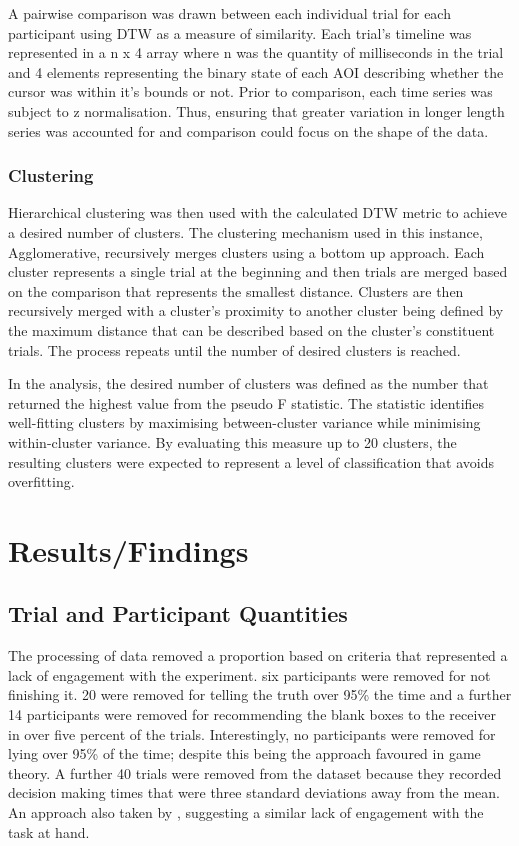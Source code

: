 \documentclass[man, floatsintext]{apa7}
\begin{document}
A pairwise comparison was drawn between each individual trial for each participant using  DTW as a measure of similarity. Each trial's timeline was represented in a n x 4 array where n was the quantity of milliseconds in the trial and 4 elements representing the binary state of each AOI describing whether the cursor was within it's bounds or not. Prior to comparison, each time series was subject to z normalisation. Thus, ensuring that greater variation in longer length series was accounted for and comparison could focus on the shape of the data.

\subsubsection{Clustering}

Hierarchical clustering was then used with the calculated DTW metric to achieve a desired number of clusters. The clustering mechanism used in this instance, Agglomerative, recursively merges clusters using a bottom up approach. Each cluster represents a single trial at the beginning and then trials are merged based on the comparison that represents the smallest distance. Clusters are then recursively merged with a cluster's proximity to another cluster being defined by the maximum distance that can be described based on the cluster's constituent trials. The process repeats until the number of desired clusters is reached.

In the analysis, the desired number of clusters was defined as the number that returned the highest value from the pseudo F statistic. The statistic identifies well-fitting clusters by maximising between-cluster variance while minimising within-cluster variance. By evaluating this measure up to 20 clusters, the resulting clusters were expected to represent a level of classification that avoids overfitting.



\section{Results/Findings}

\subsection{Trial and Participant Quantities}
\label{subsec:quantities}
The processing of data removed a proportion based on criteria that represented a lack of engagement with the experiment. six participants were removed for not finishing it. 20 were removed for telling the truth over 95\% the time and a further 14 participants were removed for recommending the blank boxes to the receiver in over five percent of the trials.  Interestingly, no participants were removed for lying over 95\% of the time; despite this being the approach favoured in game theory.  A further 40 trials were removed from the dataset because they recorded decision making times that were three standard deviations away from the mean. An approach also taken by \citeauthor{reeckSearchPredictsChanges2017b}, suggesting a similar lack of engagement with the task at hand.
\end{document}

